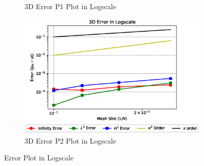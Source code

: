 \documentclass[a4paper,11pt]{article}
\begin{document}
\begin{figure}[h!]
\begin{subfigure}[b]{0.5\linewidth}
		\caption{3D Error P1 Plot in Logscale}
		\label{fig:3derrorP1}
	\end{subfigure}
	\quad
	\begin{subfigure}[b]{0.5\linewidth}
		\centering
		\includegraphics[width=\linewidth]{picture/conference/all3derrorP2}
		\caption{3D Error P2 Plot in Logscale}
		\label{fig:3derrorP2}
	\end{subfigure}
	\caption{Error Plot in Logscale}
	\label{fig:errorplot}
\end{figure}

\newpage
\end{document}

